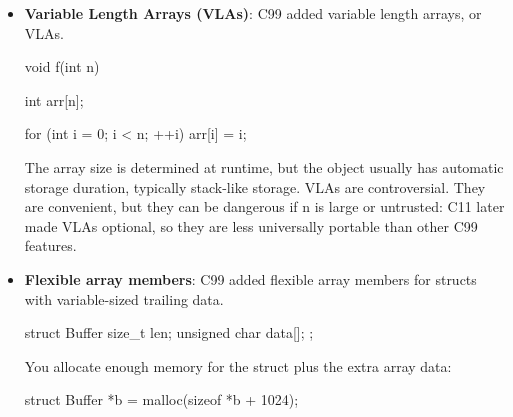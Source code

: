 \documentclass{report}
\begin{document}
\begin{itemize}
\begin{cppcode}
                    inline int square(int x) {
                        return x * x;
                    }
                \end{cppcode}
                \bigbreak \noindent 
                The purpose is to allow function-like abstractions without the problems of macros.
                \bigbreak \noindent 
                \begin{cppcode}
                #define SQUARE(x) ((x) * (x))
                SQUARE(i++) // Increments i twice
                \end{cppcode}
                \bigbreak \noindent 
                An inline function would avoid the issue above.
                \bigbreak \noindent 
                C99 inline rules are slightly subtle, especially across translation units. For header-defined functions, many projects use static inline. This gives each translation unit its own internal-linkage copy.
                \bigbreak \noindent 
                \begin{cppcode}
                    static inline int square(int x) {
                        return x*x;
                    }
                \end{cppcode}
            \item \textbf{Variable Length Arrays (VLAs)}: C99 added variable length arrays, or VLAs.
                \bigbreak \noindent 
                \begin{cppcode}
                    void f(int n) {
                        int arr[n];

                        for (int i = 0; i < n; ++i) {
                            arr[i] = i;
                        }
                    }
                \end{cppcode}
                \bigbreak \noindent 
                The array size is determined at runtime, but the object usually has automatic storage duration, typically stack-like storage.
                \bigbreak \noindent 
                VLAs are controversial. They are convenient, but they can be dangerous if n is large or untrusted:
                \bigbreak \noindent 
                C11 later made VLAs optional, so they are less universally portable than other C99 features.
            \item \textbf{Flexible array members}: C99 added flexible array members for structs with variable-sized trailing data.
                \bigbreak \noindent 
                \begin{cppcode}
                    struct Buffer {
                        size_t len;
                        unsigned char data[];
                    };
                \end{cppcode}
                \bigbreak \noindent 
                You allocate enough memory for the struct plus the extra array data:
                \bigbreak \noindent 
                \begin{cppcode}
                    struct Buffer *b = malloc(sizeof *b + 1024);


\end{cppcode}
\end{itemize}
\end{document}
